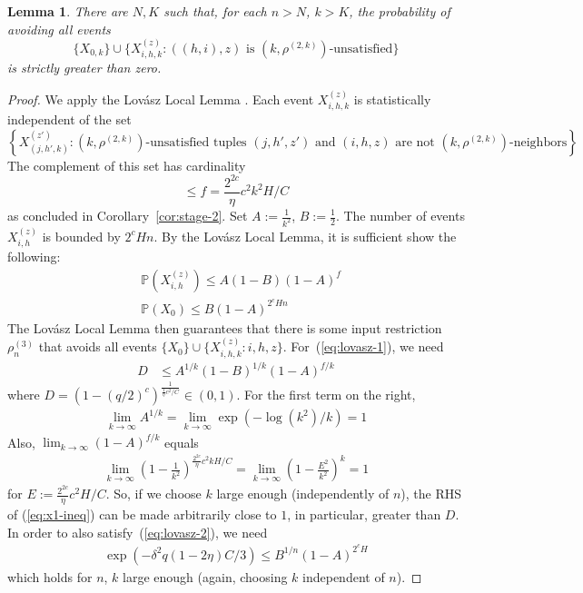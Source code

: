 \documentclass[11pt,letterpaper]{article}
\newcommand{\Prob}[0]{\mathbb{P}}
\newcounter{theorem}
\newtheorem{lemma}[theorem]{Lemma}
\begin{document}
\begin{lemma}\label{lemma:lovasz}
There are $N, K$ such that, for each $n >N$, $k > K$, the probability of avoiding all events
\begin{equation}
\{X_{0,k}\} \cup \{X_{i,h,k}^{(z)} : ((h,i),z) \text{ is } (k,\rho^{(2,k)})\text{-unsatisfied}\}
\end{equation}
is strictly greater than zero.
\end{lemma}

\begin{proof}
We apply the Lov{\'a}sz Local Lemma \cite[Theorem 6.17]{mitzenmacherprobability}.
Each event $X_{i,h,k}^{(z)}$ is statistically independent of the set 
\begin{equation}
    \left\{X_{(j,h',k)}^{(z')} : (k,\rho^{(2,k)})\text{-unsatisfied tuples } {(j,h',z')} \text{ and } {(i,h,z)} \text{ are not $(k, \rho^{(2,k)})$-neighbors}\right\}
\end{equation}
The complement of this set has cardinality 
\begin{equation}
    \leq f= \frac{2^{2c}}{\eta}c^2k^2H/C
\end{equation}
as concluded in Corollary~\ref{cor:stage-2}.
Set $A:=\frac{1}{k^2}$, $B:=\frac{1}{2}$.
The number of events $X_{i,h}^{(z)}$ is bounded by $2^c H n$.
By the Lov{\'a}sz Local Lemma, it is sufficient show the following: %
\begin{align}\label{eq:lovasz-1}
&\Prob(X_{i,h}^{(z)}) \leq A(1-B)(1-A)^{f} \\ \label{eq:lovasz-2}
&\Prob(X_0)  \leq B (1-A)^{2^cHn}
\end{align}
The Lov{\'a}sz Local Lemma then guarantees that there is some input restriction $\rho^{(3)}_n$ that avoids all events $\{X_0\} \cup \{X_{i,h,k}^{(z)} : i, h, z\}$.
For~(\ref{eq:lovasz-1}), we need
\begin{align}\label{eq:x1-ineq}
    D &\leq A^{1/k}(1-B)^{1/k}(1-A)^{f/k} 
\end{align}
where $D =  \left(1-(q/2)^c\right)^{\frac{1}{\frac{1}{\eta}c^2/C}} \in (0,1)$.
For the first term on the right, 
\begin{align*}
\lim_{k\rightarrow \infty} A^{1/k} = \lim_{k\rightarrow \infty} \exp\left(-\log(k^2) / k\right) = 1
\end{align*}
Also, $\lim_{k\rightarrow \infty} (1-A)^{f/k}$ equals
\begin{align*}
\lim_{k\rightarrow \infty} \left(1-\frac{1}{k^2}\right)^{\frac{2^{2c}}{\eta}c^2kH/C} = \lim_{k\rightarrow \infty} \left(1-\frac{E^2}{k^2}\right)^{k} = 1
\end{align*}
for $E := \frac{2^{2c}}{\eta}c^2H/C$. So, if we choose $k$ large enough (independently of $n$), the RHS of (\ref{eq:x1-ineq}) can be made arbitrarily close to $1$, in particular, greater than $D$.
In order to also satisfy~(\ref{eq:lovasz-2}), we need
\begin{align*}
\exp\left(-\delta^2q(1-2\eta)C/3\right)  \leq B^{1/n} (1-A)^{2^c H}
\end{align*}
which holds for $n$, $k$ large enough (again, choosing $k$ independent of $n$). 
\end{proof}
\end{document}
